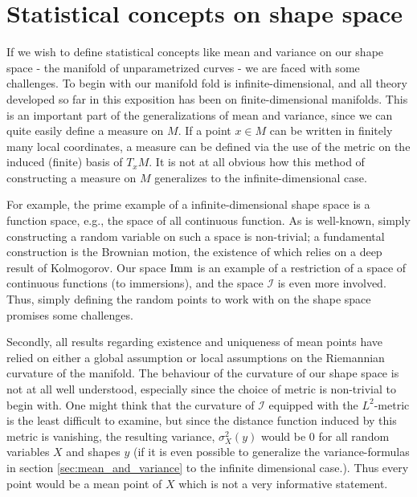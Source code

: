 \section{Statistical concepts on shape space}
\label{sec:statistical_concepts_on_shape_space}

If we wish to define statistical concepts like mean and variance on our shape space - the manifold of unparametrized curves - we are faced with some challenges. To begin with our manifold fold is infinite-dimensional, and all theory developed so far in this exposition has been on finite-dimensional manifolds. This is an important part of the generalizations of mean and variance, since we can quite easily define a measure on $M$. If a point $x \in M$ can be written in finitely many local coordinates, a measure can be defined via the use of the metric on the induced (finite) basis of $T_x M$. It is not at all obvious how this method of constructing a measure on $M$ generalizes to the infinite-dimensional case.

For example, the prime example of a infinite-dimensional shape space is a function space, e.g., the space of all continuous function. As is well-known, simply constructing a random variable on such a space is non-trivial; a fundamental construction is the Brownian motion, the existence of which relies on a deep result of Kolmogorov. Our space $\mathop{}\!\mathrm{Imm}$ is an example of a restriction of a space of continuous functions (to immersions), and the space $\mathcal{I}$ is even more involved. Thus, simply defining the random points to work with on the shape space promises some challenges.

Secondly, all results regarding existence and uniqueness of mean points have relied on either a global assumption or local assumptions on the Riemannian curvature of the manifold. The behaviour of the curvature of our shape space is not at all well understood, especially since the choice of metric is non-trivial to begin with. One might think that the curvature of $\mathcal{I}$ equipped with the $L^2$-metric is the least difficult to examine, but since the distance function induced by this metric is vanishing, the resulting variance, $\sigma^2_X(y)$ would be $0$ for all random variables $X$ and shapes $y$ (if it is even possible to generalize the variance-formulas in section \ref{sec:mean_and_variance} to the infinite dimensional case.). Thus every point would be a mean point of $X$ which is not a very informative statement.

